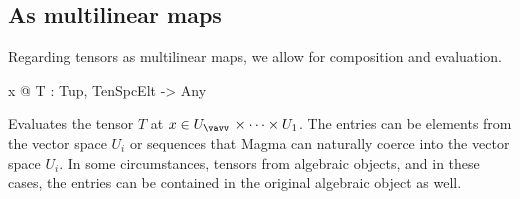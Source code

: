 \subsection{As multilinear maps}
Regarding tensors as multilinear maps, we allow for composition and evaluation.

\begin{intrinsics}
x @ T : Tup, TenSpcElt -> Any
\end{intrinsics}

Evaluates the tensor $T$ at $x\in U_{\vav}\times \cdots \times U_1$.
The entries can be elements from the vector space $U_i$ or sequences that Magma can naturally coerce into the vector space $U_i$.
In some circumstances, tensors from algebraic objects, and in these cases, the entries can be contained in the original algebraic object as well. 

